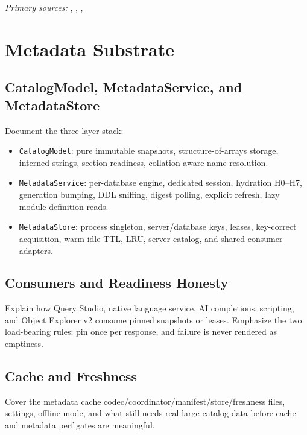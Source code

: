 \documentclass[11pt]{article}
\newcommand{\code}[1]{\texttt{#1}}
\begin{document}
\noindent\textit{Primary sources:} , , , 

\section{Metadata Substrate}

\subsection{CatalogModel, MetadataService, and MetadataStore}

Document the three-layer stack:

\begin{itemize}
	\item \code{CatalogModel}: pure immutable snapshots, structure-of-arrays storage, interned strings, section readiness, collation-aware name resolution.
	\item \code{MetadataService}: per-database engine, dedicated session, hydration H0--H7, generation bumping, DDL sniffing, digest polling, explicit refresh, lazy module-definition reads.
	\item \code{MetadataStore}: process singleton, server/database keys, leases, key-correct acquisition, warm idle TTL, LRU, server catalog, and shared consumer adapters.
\end{itemize}

\subsection{Consumers and Readiness Honesty}

Explain how Query Studio, native language service, AI completions, scripting, and Object Explorer v2 consume pinned snapshots or leases.  Emphasize the two load-bearing rules: pin once per response, and failure is never rendered as emptiness.

\subsection{Cache and Freshness}

Cover the metadata cache codec/coordinator/manifest/store/freshness files, settings, offline mode, and what still needs real large-catalog data before cache and metadata perf gates are meaningful.
\end{document}
